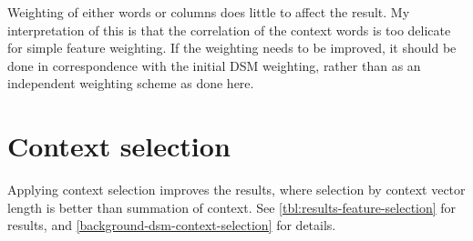 Weighting of either words or columns does little to affect the result. My interpretation of this is that the correlation of the context words is too delicate for simple feature weighting. If the weighting needs to be improved, it should be done in correspondence with the initial DSM weighting, rather than as an independent weighting scheme as done here.

\section{Context selection}\label{compressing-the-word-space-feature-selection}

Applying context selection improves the results, where selection by context vector length is better than summation of context. See \cref{tbl:results-feature-selection} for results, and \cref{background-dsm-context-selection} for details.


